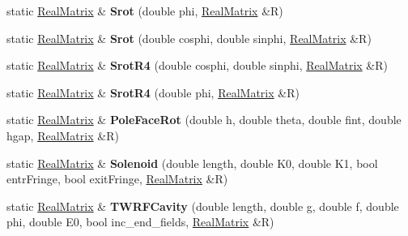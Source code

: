 \begin{DoxyCompactItemize}
\item 
\mbox{\label{classTransportMatrix_ae12fe48e213fb15374722efebc3d683b}} 
static \hyperlink{classTLAS_1_1Matrix}{Real\+Matrix} \& {\bfseries Srot} (double phi, \hyperlink{classTLAS_1_1Matrix}{Real\+Matrix} \&R)
\item 
\mbox{\label{classTransportMatrix_ab41bbe57b24a670144ec02e06eb194c8}} 
static \hyperlink{classTLAS_1_1Matrix}{Real\+Matrix} \& {\bfseries Srot} (double cosphi, double sinphi, \hyperlink{classTLAS_1_1Matrix}{Real\+Matrix} \&R)
\item 
\mbox{\label{classTransportMatrix_ab1699bb067269252d6c80c2a507eea65}} 
static \hyperlink{classTLAS_1_1Matrix}{Real\+Matrix} \& {\bfseries Srot\+R4} (double cosphi, double sinphi, \hyperlink{classTLAS_1_1Matrix}{Real\+Matrix} \&R)
\item 
\mbox{\label{classTransportMatrix_a8a7f4dfc1bf39fa2712c9d7be9c9ca24}} 
static \hyperlink{classTLAS_1_1Matrix}{Real\+Matrix} \& {\bfseries Srot\+R4} (double phi, \hyperlink{classTLAS_1_1Matrix}{Real\+Matrix} \&R)
\item 
\mbox{\label{classTransportMatrix_a8b29a14eb1f05cf951fe15f9abe35238}} 
static \hyperlink{classTLAS_1_1Matrix}{Real\+Matrix} \& {\bfseries Pole\+Face\+Rot} (double h, double theta, double fint, double hgap, \hyperlink{classTLAS_1_1Matrix}{Real\+Matrix} \&R)
\item 
\mbox{\label{classTransportMatrix_af51cccd1a76572565df680bc52f26371}} 
static \hyperlink{classTLAS_1_1Matrix}{Real\+Matrix} \& {\bfseries Solenoid} (double length, double K0, double K1, bool entr\+Fringe, bool exit\+Fringe, \hyperlink{classTLAS_1_1Matrix}{Real\+Matrix} \&R)
\item 
\mbox{\label{classTransportMatrix_a3f7767842b9b85bfc19546f13defb9ec}} 
static \hyperlink{classTLAS_1_1Matrix}{Real\+Matrix} \& {\bfseries T\+W\+R\+F\+Cavity} (double length, double g, double f, double phi, double E0, bool inc\+\_\+end\+\_\+fields, \hyperlink{classTLAS_1_1Matrix}{Real\+Matrix} \&R)
\item 
\mbox{\label{classTransportMatrix_ab07793d362fc003cb7c64719664b49f9}} 

\end{DoxyCompactItemize}
